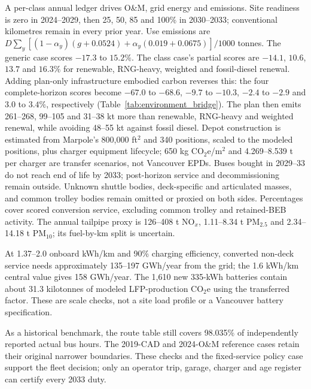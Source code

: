 \documentclass[12pt,letterpaper]{article}
\begin{document}
A per-class annual ledger drives O\&M, grid energy and emissions. Site readiness is zero in 2024--2029, then 25, 50, 85 and 100\% in 2030--2033; conventional kilometres remain in every prior year. Use emissions are $D\sum_y[(1-\alpha_y)(g+0.0524)+\alpha_y(0.019+0.0675)]/1000$ tonnes. The generic case scores $-17.3$ to $15.2\%$. The class case's partial scores are $-14.1$, $10.6$, $13.7$ and $16.3\%$ for renewable, RNG-heavy, weighted and fossil-diesel renewal. Adding plan-only infrastructure embodied carbon reverses this: the four complete-horizon scores become $-67.0$ to $-68.6$, $-9.7$ to $-10.3$, $-2.4$ to $-2.9$ and $3.0$ to $3.4\%$, respectively (Table~\ref{tab:environment_bridge}). The plan then emits 261--268, 99--105 and 31--38 kt more than renewable, RNG-heavy and weighted renewal, while avoiding 48--55 kt against fossil diesel. Depot construction is estimated from Marpole's 800,000 ft$^2$ and 340 positions, scaled to the modeled positions, plus charger equipment lifecycle; 650 kg CO$_2$e/m$^2$ and 4.269--8.539 t per charger are transfer scenarios, not Vancouver EPDs. Buses bought in 2029--33 do not reach end of life by 2033; post-horizon service and decommissioning remain outside. Unknown shuttle bodies, deck-specific and articulated masses, and common trolley bodies remain omitted or proxied on both sides. Percentages cover scored conversion service, excluding common trolley and retained-BEB activity. The annual tailpipe proxy is 126--408 t NO$_x$, 1.11--8.34 t PM$_{2.5}$ and 2.34--14.18 t PM$_{10}$; its fuel-by-km split is uncertain.\cite{icct2024,playbook2024,eea2023,prati2025,bcvanderhoof,zhao2022,corepm,yeboah2025}



At 1.37--2.0 onboard kWh/km and 90\% charging efficiency, converted non-deck service needs approximately 135--197 GWh/year from the grid; the 1.6 kWh/km central value gives 158 GWh/year. The 1,610 new 335-kWh batteries contain about 31.3 kilotonnes of modeled LFP-production CO$_2$e using the transferred factor. These are scale checks, not a site load profile or a Vancouver battery specification.

As a historical benchmark, the route table still covers 98.035\% of independently reported actual bus hours. The 2019-CAD and 2024-O\&M reference cases retain their original narrower boundaries. These checks and the fixed-service policy case support the fleet decision; only an operator trip, garage, charger and age register can certify every 2033 duty.
\end{document}
